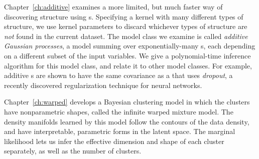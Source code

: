 Chapter~\ref{ch:additive} examines a more limited, but much faster way of discovering structure using \gp{}s.
Specifying a kernel with many different types of structure, we use kernel parameters to discard whichever types of structure are \emph{not} found in the current dataset.
The model class we examine is called \emph{additive Gaussian processes}, a model summing over exponentially-many \gp{}s, each depending on a different subset of the input variables.
We give a polynomial-time inference algorithm for this model class, and relate it to other model classes.
For example, additive \gp{}s are shown to have the same covariance as a \gp{} that uses \emph{dropout}, a recently discovered regularization technique for neural networks.

Chapter~\ref{ch:warped} develops a Bayesian clustering model in which the clusters have nonparametric shapes, called the infinite warped mixture model.
The density manifolds learned by this model follow the contours of the data density, and have interpretable, parametric forms in the latent space.
The marginal likelihood lets us infer the effective dimension and shape of each cluster separately, as well as the number of clusters.

\outbpdocument{


}


